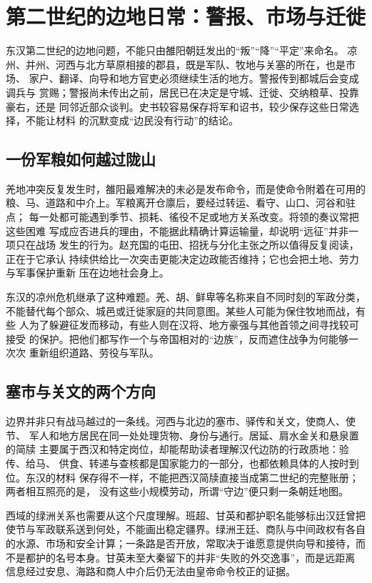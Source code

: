 \section{第二世纪的边地日常：警报、市场与迁徙}
\label{sec:eastern-han-second-borderlands}

东汉第二世纪的边地问题，不能只由雒阳朝廷发出的“叛”“降”“平定”来命名。
凉州、并州、河西与北方草原相接的郡县，既是军队、牧地与关塞的所在，也是市场、
家户、翻译、向导和地方官吏必须继续生活的地方。警报传到都城后会变成调兵与
赏赐；警报尚未传出之前，居民已在决定是守城、迁徙、交纳粮草、投靠豪右，还是
同邻近部众谈判。史书较容易保存将军和诏书，较少保存这些日常选择，不能让材料
的沉默变成“边民没有行动”的结论。

\subsection{一份军粮如何越过陇山}

羌地冲突反复发生时，雒阳最难解决的未必是发布命令，而是使命令附着在可用的
粮、马、道路和中介上。军粮离开仓廪后，要经过转运、看守、山口、河谷和驻点；
每一处都可能遇到季节、损耗、徭役不足或地方关系改变。将领的奏议常把这些困难
写成应否进兵的理由，不能据此精确计算运输量，却说明“远征”并非一项只在战场
发生的行为。赵充国的屯田、招抚与分化主张之所以值得反复阅读，正在于它承认
持续供给比一次突击更能决定边政能否维持；它也会把土地、劳力与军事保护重新
压在边地社会身上。

东汉的凉州危机继承了这种难题。羌、胡、鲜卑等名称来自不同时刻的军政分类，
不能替代每个部众、城邑或迁徙家庭的共同意图。某些人可能为保住牧地而战，有些
人为了躲避征发而移动，有些人则在汉将、地方豪强与其他首领之间寻找较可接受
的保护。把他们都写作一个与帝国相对的“边族”，反而遮住战争为何能够一次次
重新组织道路、劳役与军队。

\subsection{塞市与关文的两个方向}

边界并非只有战马越过的一条线。河西与北边的塞市、驿传和关文，使商人、使节、
军人和地方居民在同一处处理货物、身份与通行。居延、肩水金关和悬泉置的简牍
主要属于西汉和特定岗位，却能帮助读者理解汉代边防的行政质地：验传、给马、
供食、转递与查核都是国家能力的一部分，也都依赖具体的人按时到位。东汉的材料
保存得不一样，不能把西汉简牍直接当成第二世纪的完整账册；两者相互照亮的是，
没有这些小规模劳动，所谓“守边”便只剩一条朝廷地图。

西域的绿洲关系也需要从这个尺度理解。班超、甘英和都护职名能够标出汉廷曾把
使节与军政联系送到何处，不能画出稳定疆界。绿洲王廷、商队与中间政权有各自
的水源、市场和安全计算；一条路是否开放，常取决于谁愿意提供向导和接待，而
不是都护的名号本身。甘英未至大秦留下的并非“失败的外交逸事”，而是远距离
信息经过安息、海路和商人中介后仍无法由皇帝命令校正的证据。

